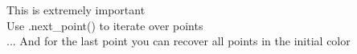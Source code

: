 \documentclass[preview]{standalone}
\begin{document}
This is extremely important\\Use .next\_point() to iterate over points\\... And for the last point you can recover all points in the initial color\\
\end{document}
